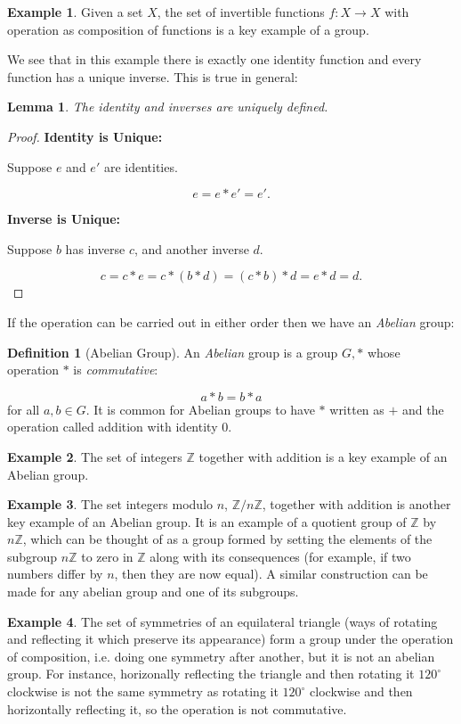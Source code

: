 \documentclass{article}
\newtheorem{lem}[theorem]{Lemma}
\theoremstyle{definition}
\newtheorem{definition}{Definition}[section]
\theoremstyle{definition}
\theoremstyle{definition}
\newtheorem{eg}{Example}[section]
\newcommand{\Z}{\mathbb{Z}}
\begin{document}
\begin{eg}
    Given a set $X$, the set of invertible functions $f:X\to X$ with operation as composition of functions is a key example of a group.
\end{eg}
We see that in this example there is exactly one identity function and every function has a unique inverse. This is true in general:
\begin{lem}
    The identity and inverses are uniquely defined.
\end{lem}
\begin{proof}
\textbf{Identity is Unique:}

Suppose $e$ and $e'$ are identities.

\[
e = e * e' = e'.
\]

\textbf{Inverse is Unique:}

Suppose $b$ has inverse $c$, and another inverse $d$.

\[
c = c * e = c * (b * d) = (c * b) * d = e * d = d.
\]

    
\end{proof}
If the operation can be carried out in either order then we have an \emph{Abelian} group:

\begin{definition}[Abelian Group]
    An \emph{Abelian} group is a group $G,*$ whose operation $*$ is \emph{commutative}:

$$a*b=b*a$$
    for all $a,b\in G$. It is common for Abelian groups to have $*$ written as $+$ and the operation called addition with identity $0$.
\end{definition}

\begin{eg}
   The set of integers   $\Z$ together with addition is a key example of an Abelian group.
\end{eg}



\begin{eg}  The set integers modulo $n$, $\Z/n\Z$, together with addition is another key example of an Abelian group. It is an example of a quotient group of $\Z$ by $n\Z$, which can be thought of as a group formed by setting the elements of the subgroup $n\Z$ to zero in $\Z$ along with its consequences (for example, if two numbers differ by $n$, then they are now equal). A similar construction can be made for any abelian group and one of its subgroups.
\end{eg}

\begin{eg}
The set of symmetries of an equilateral triangle (ways of rotating and reflecting it which preserve its appearance) form a group under the operation of composition, i.e. doing one symmetry after another, but it is not an abelian group. For instance, horizonally reflecting the triangle and then rotating it $120^\circ$ clockwise is not the same symmetry as rotating it $120^\circ$ clockwise and then horizontally reflecting it, so the operation is not commutative.
\end{eg}
\end{document}
